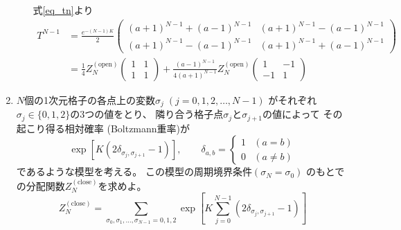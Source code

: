 \documentclass[12pt,b5paper]{ltjsarticle}
\begin{document}
\begin{enumerate}
\begin{enumerate}
            式\eqref{eq_tn}より
            \begin{align}
             T^{N-1} &=
              \frac{e^{-(N-1)K}}{2}
              \begin{pmatrix}
               (a+1)^{N-1} + (a-1)^{N-1} & (a+1)^{N-1} - (a-1)^{N-1} \\
               (a+1)^{N-1} - (a-1)^{N-1} & (a+1)^{N-1} + (a-1)^{N-1}
              \end{pmatrix}\\
             &=
              \frac{1}{4}Z^{(\mathrm{open})}_{N}
              \begin{pmatrix} 1 & 1 \\ 1 & 1 \end{pmatrix}
             +
              \frac{(a-1)^{N-1}}{4(a+1)^{N-1}}Z^{(\mathrm{open})}_{N}
              \begin{pmatrix}
               1 & -1 \\
               -1 & 1
              \end{pmatrix}
            \end{align}



             \hrulefill
      \end{enumerate}

 \item
      $N$個の1次元格子の各点上の変数$\sigma_{j} \; (j=0,1,2,\dots,N-1)$
      がそれぞれ$\sigma_{j} \in \{0,1,2\}$の3つの値をとり、
      隣り合う格子点$\sigma_{j}$と$\sigma_{j+1}$の値によって
      その起こり得る相対確率 (Boltzmann重率)が
      \begin{equation}
       \exp \left[ K(2\delta_{\sigma_{j},\sigma_{j+1}}-1) \right],
        \qquad
        \delta_{a,b} = \begin{cases}
                        1 & (a = b)\\ 0 & (a\ne b)
                       \end{cases}
      \end{equation}
      であるような模型を考える。
      この模型の周期境界条件$(\sigma_{N} = \sigma_{0})$
      のもとでの分配関数$Z^{(\mathrm{close})}_{N}$を求めよ。
      \begin{equation}
       Z^{(\mathrm{close})}_{N} =
        \sum_{\sigma_{0},\sigma_{1},\dots,\sigma_{N-1} = 0,1,2}
        \exp \left[
              K \sum_{j=0}^{N-1} (2\delta_{\sigma_{j},\sigma_{j+1}}-1)
             \right]
      \end{equation}


\end{enumerate}
\end{document}
